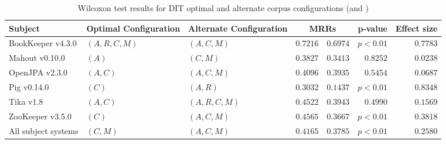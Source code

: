 \begin{landscape}
\begin{table}
\begin{spacing}{1.2}
\centering
\caption{Wilcoxon test results for DIT optimal and alternate corpus configurations (\cone and \ctwo)}
\label{table:combo-dit-corpus-sweep-wilcox}
\begin{tabular}{lllrrrr}
\toprule
                      Subject & Optimal Configuration & Alternate Configuration & \multicolumn{2}{c}{MRRs}  &  p-value & Effect size \\
\midrule
            BookKeeper v4.3.0 &        $(A, R, C, M)$ &             $(A, C, M)$ &    $0.7216$ &      $0.6974$ & $p<0.01$ &    $0.7783$ \\
               Mahout v0.10.0 &                 $(A)$ &                $(C, M)$ &    $0.3827$ &      $0.3413$ & $0.8252$ &    $0.0238$ \\
               OpenJPA v2.3.0 &              $(A, C)$ &             $(A, C, M)$ &    $0.4096$ &      $0.3935$ & $0.5454$ &    $0.0687$ \\
                  Pig v0.14.0 &                 $(C)$ &                $(A, R)$ &    $0.3032$ &      $0.1437$ & $p<0.01$ &    $0.8348$ \\
                    Tika v1.8 &              $(A, C)$ &          $(A, R, C, M)$ &    $0.4522$ &      $0.3943$ & $0.4990$ &    $0.1569$ \\
             ZooKeeper v3.5.0 &                 $(C)$ &             $(A, C, M)$ &    $0.4565$ &      $0.3667$ & $p<0.01$ &    $0.3818$ \\
 \midrule
All subject systems &              $(C, M)$ &             $(A, C, M)$ &    $0.4165$ &      $0.3785$ & $p<0.01$ &    $0.2580$ \\
\bottomrule
\end{tabular}

\end{spacing}
\end{table}

\end{landscape}
